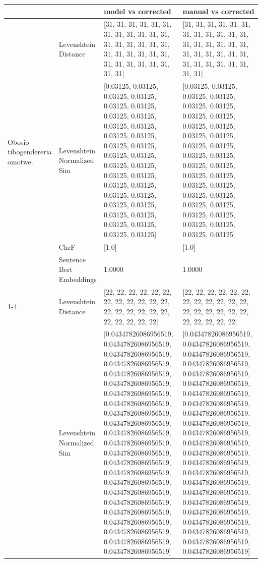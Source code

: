 \begin{tabular}{llll}
\toprule
 &  & model vs corrected & manual vs corrected \\
\midrule
\multirow[t]{4}{*}{Obosio tibogendereria omotwe.} & Levenshtein Distance & [31, 31, 31, 31, 31, 31, 31, 31, 31, 31, 31, 31, 31, 31, 31, 31, 31, 31, 31, 31, 31, 31, 31, 31, 31, 31, 31, 31, 31, 31, 31, 31] & [31, 31, 31, 31, 31, 31, 31, 31, 31, 31, 31, 31, 31, 31, 31, 31, 31, 31, 31, 31, 31, 31, 31, 31, 31, 31, 31, 31, 31, 31, 31, 31] \\
 & Levenshtein Normalized Sim & [0.03125, 0.03125, 0.03125, 0.03125, 0.03125, 0.03125, 0.03125, 0.03125, 0.03125, 0.03125, 0.03125, 0.03125, 0.03125, 0.03125, 0.03125, 0.03125, 0.03125, 0.03125, 0.03125, 0.03125, 0.03125, 0.03125, 0.03125, 0.03125, 0.03125, 0.03125, 0.03125, 0.03125, 0.03125, 0.03125, 0.03125, 0.03125] & [0.03125, 0.03125, 0.03125, 0.03125, 0.03125, 0.03125, 0.03125, 0.03125, 0.03125, 0.03125, 0.03125, 0.03125, 0.03125, 0.03125, 0.03125, 0.03125, 0.03125, 0.03125, 0.03125, 0.03125, 0.03125, 0.03125, 0.03125, 0.03125, 0.03125, 0.03125, 0.03125, 0.03125, 0.03125, 0.03125, 0.03125, 0.03125] \\
 & ChrF & [1.0] & [1.0] \\
 & Sentence Bert Embeddings & 1.0000 & 1.0000 \\
\cline{1-4}
\multirow[t]{4}{*}{Amang'ana mbeo tigocha konyora.} & Levenshtein Distance & [22, 22, 22, 22, 22, 22, 22, 22, 22, 22, 22, 22, 22, 22, 22, 22, 22, 22, 22, 22, 22, 22, 22] & [22, 22, 22, 22, 22, 22, 22, 22, 22, 22, 22, 22, 22, 22, 22, 22, 22, 22, 22, 22, 22, 22, 22] \\
 & Levenshtein Normalized Sim & [0.04347826086956519, 0.04347826086956519, 0.04347826086956519, 0.04347826086956519, 0.04347826086956519, 0.04347826086956519, 0.04347826086956519, 0.04347826086956519, 0.04347826086956519, 0.04347826086956519, 0.04347826086956519, 0.04347826086956519, 0.04347826086956519, 0.04347826086956519, 0.04347826086956519, 0.04347826086956519, 0.04347826086956519, 0.04347826086956519, 0.04347826086956519, 0.04347826086956519, 0.04347826086956519, 0.04347826086956519, 0.04347826086956519] & [0.04347826086956519, 0.04347826086956519, 0.04347826086956519, 0.04347826086956519, 0.04347826086956519, 0.04347826086956519, 0.04347826086956519, 0.04347826086956519, 0.04347826086956519, 0.04347826086956519, 0.04347826086956519, 0.04347826086956519, 0.04347826086956519, 0.04347826086956519, 0.04347826086956519, 0.04347826086956519, 0.04347826086956519, 0.04347826086956519, 0.04347826086956519, 0.04347826086956519, 0.04347826086956519, 0.04347826086956519, 0.04347826086956519] \\

\end{tabular}
